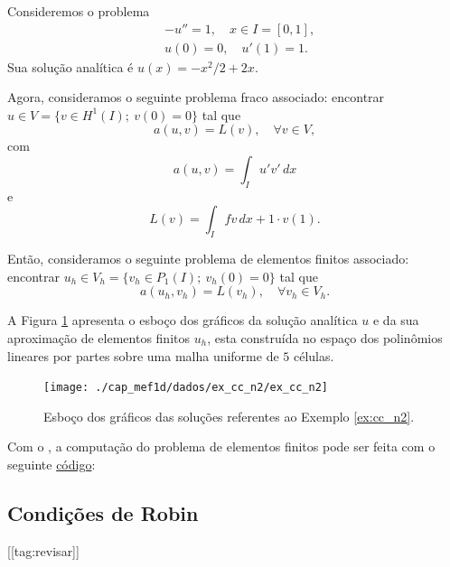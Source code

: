 \begin{ex}\label{ex:cc_n2}
  Consideremos o problema
  \begin{align}
    &-u'' = 1,\quad x\in I=[0,1],\label{eq:ex_cc_n2_eq}\\
    &u(0) = 0,\quad u'(1) = 1.\label{eq:ex_cc_n2_bc}
  \end{align}
Sua solução analítica é $u(x) = -x^2/2+2x$. 

Agora, consideramos o seguinte problema fraco associado: encontrar $u\in V=\{v\in H^1(I);~v(0)=0\}$ tal que
\begin{equation}
  a(u,v) = L(v),\quad\forall v\in V,
\end{equation}
com
\begin{equation}
  a(u, v) = \int_I u'v'\,dx
\end{equation}
e
\begin{equation}
  L(v) = \int_I fv\,dx + 1\cdot v(1).
\end{equation}

Então, consideramos o seguinte problema de elementos finitos associado: encontrar $u_h\in V_h = \{v_h\in P_1(I);~v_h(0)=0\}$ tal que
\begin{equation}
  a(u_h, v_h) = L(v_h),\quad\forall v_h\in V_h.
\end{equation}

A Figura \ref{fig:ex_cc_n2} apresenta o esboço dos gráficos da solução analítica $u$ e da sua aproximação de elementos finitos $u_h$, esta construída no espaço dos polinômios lineares por partes sobre uma malha uniforme de $5$ células.

\begin{figure}[h!]
  \centering
  \texttt{[image: ./cap\_mef1d/dados/ex\_cc\_n2/ex\_cc\_n2]}
  \caption{Esboço dos gráficos das soluções referentes ao Exemplo \ref{ex:cc_n2}.}
  \label{fig:ex_cc_n2}
\end{figure}

\ifispython
Com o \fenics, a computação do problema de elementos finitos pode ser feita com o seguinte \href{https://github.com/phkonzen/notas/blob/master/src/MetodoElementosFinitos/cap_mef1d/dados/ex_cc_n2/ex_cc_n2.py}{código}:

\fi
\end{ex} 

\subsection{Condições de Robin}
[[tag:revisar]]

